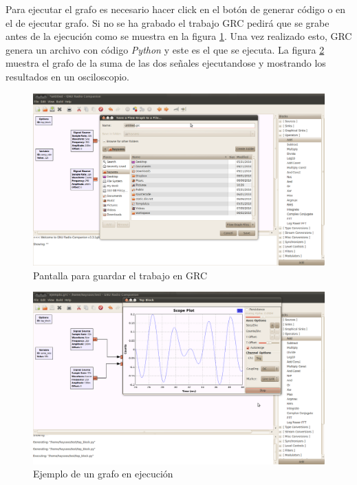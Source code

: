 Para ejecutar el grafo es necesario hacer click en el bot\'on de generar c\'odigo o en el de ejecutar
grafo. Si no se ha grabado el trabajo GRC pedir\'a que se grabe antes de la ejecuci\'on como se
muestra en la figura \ref{fig:savegrc}. Una vez realizado esto, GRC genera un archivo con c\'odigo
\emph{Python} y este es el que se ejecuta. La figura \ref{fig:rungrc} muestra el grafo de la suma de las
dos se\~nales ejecutandose y mostrando los resultados en un osciloscopio.

\begin{figure}[htp]
  \centering
  \includegraphics[width=5.5in]{figs/grc5}
  \vspace{0.1in}
  \caption{Pantalla para guardar el trabajo en GRC}
  \label{fig:savegrc}
\end{figure}

\begin{figure}[htp]
  \centering
  \includegraphics[width=5.5in]{figs/grc7}
  \vspace{0.1in}
  \caption{Ejemplo de un grafo en ejecuci\'on}
  \label{fig:rungrc}
\end{figure}

